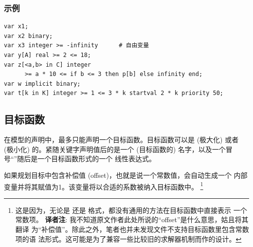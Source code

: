 \subsubsection{示例}
{\small
\begin{verbatim}
var x1;
var x2 binary;
var x3 integer >= -infinity      # 自由变量
var y[A] real >= 2 <= 18;
var z[<a,b> in C] integer
      >= a * 10 <= if b <= 3 then p[b] else infinity end;
var w implicit binary;
var t[k in K] integer >= 1 <= 3 * k startval 2 * k priority 50;
\end{verbatim}
}



\subsection{目标函数}
在模型的声明中，最多只能声明一个目标函数。目标函数可以是
(极大化) 或者 (极小化) 的。紧随关键字声明值后的是一个 
(目标函数的) 名字，以及一个冒号“\code{:}”随后是一个目标函数形式的一个
线性表达式。

如果规划目标中包含补偿值 (offset)，也就是说一个常数值，\zimpl 会自动生成一个
内部变量并将其赋值为1。该变量将以合适的系数被纳入目标函数中。
\footnote{
  这是因为，无论是 \lpf 还是 \mps 格式，都没有通用的方法在目标函数中直接表示
  一个常数项。
  \textbf{译者注}: 我不知道原文作者此处所说的“offset”是什么意思，姑且将其翻译
  为“补偿值”。除此之外，笔者也并未发现\lpf 文件不支持目标函数里包含常数项的语
  法形式。这可能是为了兼容一些比较旧的求解器机制而作的设计。
}

